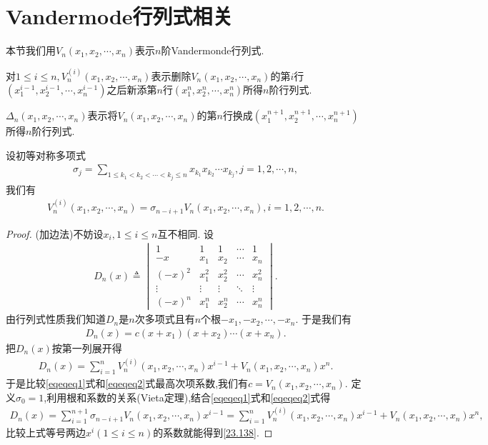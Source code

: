 \documentclass[../../main.tex]{subfiles}
\begin{document}
\section{Vandermode行列式相关}

本节我们用\(V_n(x_1,x_2,\cdots,x_n)\)表示\(n\)阶Vandermonde行列式.

对\(1\leqslant i\leqslant n,V_n^{(i)}(x_1,x_2,\cdots,x_n)\)表示删除\(V_n(x_1,x_2,\cdots,x_n)\)的第\(i\)行\((x_1^{i - 1},x_2^{i - 1},\cdots,x_n^{i - 1})\)之后新添第\(n\)行\((x_1^{n},x_2^{n},\cdots,x_n^{n})\)所得\(n\)阶行列式.

\(\Delta_n(x_1,x_2,\cdots,x_n)\)表示将\(V_n(x_1,x_2,\cdots,x_n)\)的第\(n\)行换成\((x_1^{n + 1},x_2^{n + 1},\cdots,x_n^{n + 1})\)所得\(n\)阶行列式.

\begin{proposition}\label{proposition:初等对称多项式与Vandermode行列式}
设初等对称多项式
\begin{align*}
\sigma_j=\sum_{1\leqslant k_1<k_2<\cdots<k_j\leqslant n}x_{k_1}x_{k_2}\cdots x_{k_j},j = 1,2,\cdots,n,
\end{align*}
我们有
\begin{align}
V_n^{(i)}(x_1,x_2,\cdots,x_n)=\sigma_{n - i + 1}V_n(x_1,x_2,\cdots,x_n),i = 1,2,\cdots,n.\label{23.138}
\end{align}
\end{proposition}
\begin{proof}
(加边法)不妨设\(x_i,1\leqslant i\leqslant n\)互不相同. 设
\begin{align*}
D_n(x)\triangleq\begin{vmatrix}
1&1&1&\cdots&1\\
-x&x_1&x_2&\cdots&x_n\\
(-x)^2&x_1^2&x_2^2&\cdots&x_n^2\\
\vdots&\vdots&\vdots&\ddots&\vdots\\
(-x)^n&x_1^n&x_2^n&\cdots&x_n^n
\end{vmatrix}.
\end{align*}
由行列式性质我们知道\(D_n\)是\(n\)次多项式且有\(n\)个根\(-x_1,-x_2,\cdots,-x_n\). 于是我们有
\begin{align}\label{eqeqeq1}
D_n(x)=c(x + x_1)(x + x_2)\cdots(x + x_n).
\end{align}
把\(D_n(x)\)按第一列展开得
\begin{align}\label{eqeqeq2}
D_n(x)=\sum_{i = 1}^{n}V_n^{(i)}(x_1,x_2,\cdots,x_n)x^{i - 1}+V_n(x_1,x_2,\cdots,x_n)x^n.
\end{align}
于是比较\eqref{eqeqeq1}式和\eqref{eqeqeq2}式最高次项系数,我们有\(c = V_n(x_1,x_2,\cdots,x_n)\). 定义\(\sigma_0 = 1\),利用根和系数的关系(Vieta定理),结合\eqref{eqeqeq1}式和\eqref{eqeqeq2}式得
\begin{align*}
D_n(x)=\sum_{i = 1}^{n + 1}\sigma_{n - i + 1}V_n(x_1,x_2,\cdots,x_n)x^{i - 1}=\sum_{i = 1}^{n}V_n^{(i)}(x_1,x_2,\cdots,x_n)x^{i - 1}+V_n(x_1,x_2,\cdots,x_n)x^n,
\end{align*}
比较上式等号两边$x^i(1\leq i\leq n)$的系数就能得到\eqref{23.138}. 
\end{proof}
\end{document}
